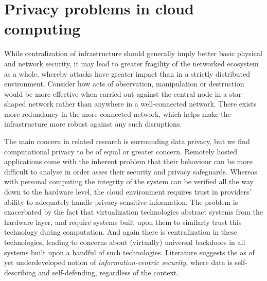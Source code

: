 \documentclass[11pt]{article}
\begin{document}
\section{Privacy problems in cloud computing}
\label{sec:problems_in_cloud_computing}

While centralization of infrastructure should generally imply better basic physical and network security, it may lead to greater fragility of the networked ecosystem as a whole, whereby attacks have greater impact than in a strictly distributed environment.
Consider how acts of observation, manipulation or destruction would be more effective when carried out against the central node in a star-shaped network rather than anywhere in a well-connected network.
There exists more redundancy in the more connected network, which helps make the infrastructure more robust against any such disruptions.

The main concern in related research is surrounding data privacy, but we find computational privacy to be of equal or greater concern.
Remotely hosted applications come with the inherent problem that their behaviour can be more difficult to analyse in order asses their security and privacy safeguards.
Whereas with personal computing the integrity of the system can be verified all the way down to the hardware level, the cloud environment requires trust in providers' ability to adequately handle privacy-sensitive information.
The problem is exacerbated by the fact that virtualization technologies abstract systems from the hardware layer, and require systems built upon them to similarly trust this technology during computation.
And again there is centralization in these technologies, leading to concerns about (virtually) universal backdoors in all systems built upon a handful of such technologies.
Literature suggests the as of yet underdeveloped notion of \textit{information-centric security}, where data is self-describing and self-defending, regardless of the context. \cite{chow2009controlling}

\end{document}
